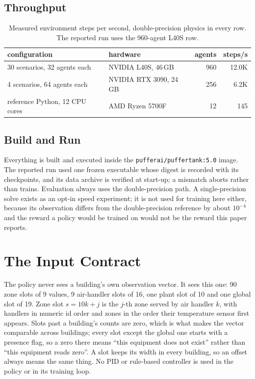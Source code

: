 \documentclass{article}
\begin{document}
\subsection{Throughput}
\label{app:throughput}

\begin{table}[h!]
\centering
\small
\begin{tabular}{@{}llrr@{}}
\toprule
configuration & hardware & agents & steps/s \\
\midrule
30 scenarios, 32 agents each & NVIDIA L40S, 46\,GB & 960 & 12.0K \\
4 scenarios, 64 agents each & NVIDIA RTX 3090, 24\,GB & 256 & 6.2K \\
reference Python, 12 CPU cores & AMD Ryzen 5700F & 12 & 145 \\
\bottomrule
\end{tabular}
\vspace{4pt}
\caption{Measured environment steps per second, double-precision physics in every row. The reported run uses the 960-agent L40S row.}
\label{tab:app_throughput}
\end{table}

\subsection{Build and Run}
\label{app:build}

Everything is built and executed inside the \texttt{pufferai/puffertank:5.0} image. The reported run used one frozen executable whose digest is recorded with its checkpoints, and its data archive is verified at start-up; a mismatch aborts rather than trains. Evaluation always uses the double-precision path. A single-precision solve exists as an opt-in speed experiment; it is not used for training here either, because its observation differs from the double-precision reference by about $10^{-4}$ and the reward a policy would be trained on would not be the reward this paper reports.

\section{The Input Contract}
\label{app:contract}

The policy never sees a building's own observation vector. It sees this one: 90 zone slots of 9 values, 9 air-handler slots of 16, one plant slot of 10 and one global slot of 19. Zone slot $s = 10k + j$ is the $j$-th zone served by air handler $k$, with handlers in numeric id order and zones in the order their temperature sensor first appears. Slots past a building's counts are zero, which is what makes the vector comparable across buildings; every slot except the global one starts with a presence flag, so a zero there means ``this equipment does not exist'' rather than ``this equipment reads zero''. A slot keeps its width in every building, so an offset always means the same thing. No PID or rule-based controller is used in the policy or in its training loop.
\end{document}
